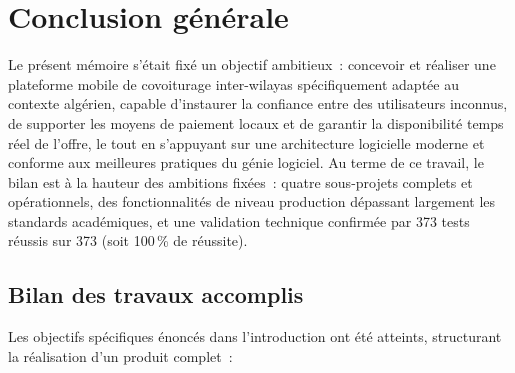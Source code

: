 \documentclass[12pt, a4paper, oneside]{report}
\begin{document}
\chapter*{Conclusion générale}

Le présent mémoire s'était fixé un objectif ambitieux~: concevoir et réaliser une plateforme mobile de covoiturage inter-wilayas spécifiquement adaptée au contexte algérien, capable d'instaurer la confiance entre des utilisateurs inconnus, de supporter les moyens de paiement locaux et de garantir la disponibilité temps réel de l'offre, le tout en s'appuyant sur une architecture logicielle moderne et conforme aux meilleures pratiques du génie logiciel. Au terme de ce travail, le bilan est à la hauteur des ambitions fixées~: quatre sous-projets complets et opérationnels, des fonctionnalités de niveau production dépassant largement les standards académiques, et une validation technique confirmée par 373 tests réussis sur 373 (soit 100\,\% de réussite).

\section*{Bilan des travaux accomplis}

Les objectifs spécifiques énoncés dans l'introduction ont été atteints, structurant la réalisation d'un produit complet~:
\end{document}
